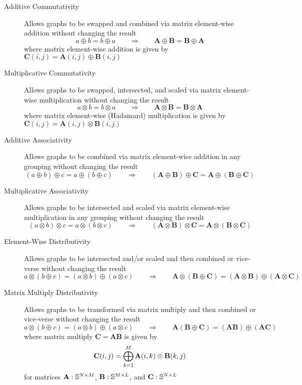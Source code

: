 \begin{description}
\item[Additive Commutativity] Allows graphs to be swapped and combined via matrix element-wise addition without changing the result
  $$
      a \oplus b = b \oplus a  ~~~~~~~~~ \Rightarrow ~~~~~~~~~
      \mathbf{A} \oplus \mathbf{B} = \mathbf{B} \oplus \mathbf{A}
  $$
  where matrix element-wise addition is given by
     $\mathbf{C}(i,j) = \mathbf{A}(i,j) \oplus \mathbf{B}(i,j)$
     
\item[Multiplicative Commutativity] Allows graphs to be swapped, intersected, and scaled via matrix element-wise multiplication without changing the result
  $$
      a \otimes b = b \otimes a  ~~~~~~~~~ \Rightarrow ~~~~~~~~~
      \mathbf{A} \otimes \mathbf{B} = \mathbf{B} \otimes \mathbf{A}
  $$
    where matrix element-wise (Hadamard) multiplication is given by
     $\mathbf{C}(i,j) = \mathbf{A}(i,j) \otimes \mathbf{B}(i,j)$

\item[Additive Associativity] Allows graphs to be combined via matrix element-wise addition in any grouping without changing the result
  $$
      (a \oplus b) \oplus c = a \oplus (b \oplus c)   ~~~~~~~~~ \Rightarrow ~~~~~~~~~
      (\mathbf{A} \oplus \mathbf{B}) \oplus \mathbf{C} = \mathbf{A} \oplus (\mathbf{B} \oplus \mathbf{C})
  $$

\item[Multiplicative Associativity] Allows graphs to be intersected and scaled via matrix element-wise multiplication in any grouping without changing the result
  $$
      (a \otimes b) \otimes c = a \otimes (b \otimes c)   ~~~~~~~~~ \Rightarrow ~~~~~~~~~
      (\mathbf{A} \otimes \mathbf{B}) \otimes \mathbf{C} = \mathbf{A} \otimes (\mathbf{B} \otimes \mathbf{C})
  $$

\item[Element-Wise Distributivity] Allows graphs to be intersected and/or scaled and then combined or vice-verse without changing the result
  $$
      a \otimes (b \oplus c) = (a \otimes b) \oplus (a \otimes c)   ~~~~~~~~~ \Rightarrow ~~~~~~~~~
      \mathbf{A} \otimes (\mathbf{B} \oplus \mathbf{C}) = (\mathbf{A} \otimes \mathbf{B}) \oplus (\mathbf{A} \otimes \mathbf{C})
  $$

\item[Matrix Multiply Distributivity] Allows graphs to be transformed via matrix multiply and then combined or vice-verse without changing the result
  $$
      a \otimes (b \oplus c) = (a \otimes b) \oplus (a \otimes c)   ~~~~~~~~~ \Rightarrow ~~~~~~~~~
      \mathbf{A} (\mathbf{B} \oplus \mathbf{C}) = (\mathbf{A} \mathbf{B}) \oplus (\mathbf{A} \mathbf{C})
  $$
  where matrix multiply $\mathbf{C} = \mathbf{A} \mathbf{B}$ is given by
  $$
   {\bf C}(i,j) = \bigoplus_{k=1}^M {\bf A}(i,k) \otimes {\bf B}(k,j)
  $$
  for matrices  ${\bf A}: \mathbb{S}^{N \times M}$,  ${\bf B}: \mathbb{S}^{M \times L}$, and ${\bf C}: \mathbb{S}^{N \times L}$


\end{description}
